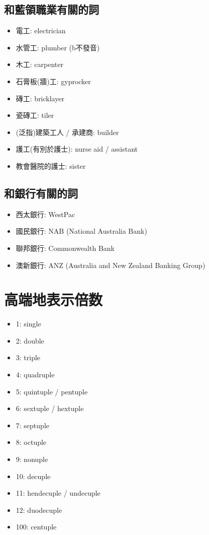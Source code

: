 \subsection{和藍領職業有關的詞}
\begin{multicols}{2}
\begin{itemize}
  \itemsep0em
  \item 電工: electrician
  \item 水管工: plumber (b不發音)
  \item 木工: carpenter
  \item 石膏板(牆)工: gyprocker
  \item 磚工: bricklayer
  \item 瓷磚工: tiler
  \item (泛指)建築工人 / 承建商: builder
  \item 護工(有別於護士): nurse aid / assistant
  \item 教會醫院的護士: sister
\end{itemize}
\end{multicols}

\subsection{和銀行有關的詞}
\begin{itemize}
  \itemsep0em
  \item 西太銀行: WestPac
  \item 國民銀行: NAB (National Australia Bank)
  \item 聯邦銀行: Commonwealth Bank
  \item 澳新銀行: ANZ (Australia and New Zealand Banking Group)
\end{itemize}

\section{高端地表示倍数}
\begin{multicols}{3}
\begin{itemize}
  \itemsep0em
  \item 1: single
  \item 2: double
  \item 3: triple
  \item 4: quadruple
  \item 5: quintuple / pentuple
  \item 6: sextuple / hextuple
  \item 7: septuple
  \item 8: octuple
  \item 9: nonuple
  \item 10: decuple
  \item 11: hendecuple / undecuple
  \item 12: duodecuple
  \item 100: centuple
\end{itemize}
\end{multicols}

